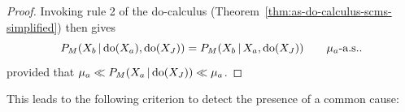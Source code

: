 \begin{proof}
Invoking rule 2 of the do-calculus (Theorem~\ref{thm:as-do-calculus-scms-simplified}) then gives 
  $$P_{M}(X_b \operatorname*{|} \operatorname{do}(X_a), \operatorname{do}(X_J)) = P_{M}(X_b \operatorname*{|} X_a, \operatorname{do}(X_J)) \qquad \mu_a\text{-a.s.}.$$
provided that $\mu_a \ll P_M(X_a \operatorname*{|} \operatorname{do}(X_J)) \ll \mu_a$.
\end{proof}
This leads to the following criterion to detect the presence of a common cause:
